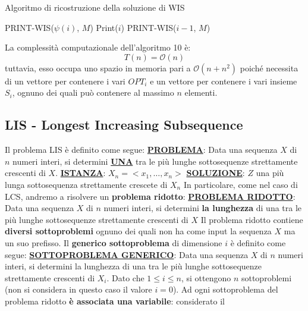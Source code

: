 \documentclass[12pt]{article}
\begin{document}
\begin{algorithm}[H]
    \caption{Algoritmo di ricostruzione della soluzione di WIS}
    \DontPrintSemicolon
     {
         {
             {
                PRINT-WIS($\psi(i)$, $M$) \;
                Print($i$)
            } {
                PRINT-WIS($i-1$, $M$)
            }
        }
    }
\end{algorithm} \noindent
La complessità computazionale dell'algoritmo 10 è:
$$T(n) = \mathcal{O}(n)$$
tuttavia, esso occupa uno spazio in memoria pari a $\mathcal{O}(n + n^2)$ poiché necessita
di un vettore per contenere i vari $OPT_i$ e un vettore per contenere i vari insieme $S_i$, ognuno dei quali può contenere
al massimo $n$ elementi.
\subsection{LIS - Longest Increasing Subsequence}
Il problema LIS è definito come segue: \newline
\textbf{\underline{PROBLEMA}}: Data una sequenza $X$ di $n$ numeri interi, si determini \textbf{\underline{UNA}} tra le più lunghe sottosequenze strettamente crescenti di $X$. \newline
\textbf{\underline{ISTANZA}}: $X_n = <x_1, \dots, x_n>$ \newline
\textbf{\underline{SOLUZIONE}}: $Z$ una più lunga sottosequenza strettamente crescete di $X_n$ \newline
In particolare, come nel caso di LCS, andremo a risolvere un \textbf{problema ridotto}: \newline
\textbf{\underline{PROBLEMA RIDOTTO}}: Data una sequenza $X$ di $n$ numeri interi, si determini \textbf{la lunghezza} di una tra le più lunghe sottosequenze strettamente crescenti di $X$ \newline
Il problema ridotto contiene \textbf{diversi sottoproblemi} ognuno dei quali non ha come input la sequenza $X$ ma un suo prefisso.
Il \textbf{generico sottoproblema} di dimensione $i$ è definito come segue: \newline
\textbf{\underline{SOTTOPROBLEMA GENERICO}}: Data una sequenza $X$ di $n$ numeri interi, si determini la lunghezza di una tra le più lunghe sottosequenze strettamente crescenti di $X_i$. \newline
Dato che $1 \leq i \leq n$, si ottengono $n$ sottoproblemi (non si considera in questo caso il valore $i = 0$). Ad ogni sottoproblema del problema ridotto \textbf{è associata una variabile}: considerato il 
\end{document}
